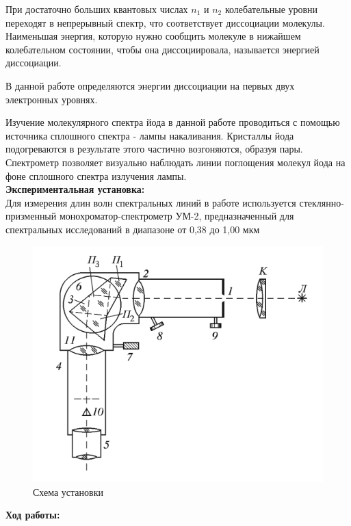 \documentclass[a4paper, 12pt]{article}%
\begin{document}
	При достаточно больших квантовых числах $n_1$ и $n_2$ колебательные уровни переходят в непрерывный спектр, что соответствует диссоциации молекулы. Наименьшая энергия, которую нужно сообщить молекуле в нижайшем колебательном состоянии, чтобы она диссоциировала, называется энергией диссоциации.
	
	В данной работе определяются энергии диссоциации на первых двух электронных уровнях.
	
	 Изучение молекулярного спектра йода в данной работе проводиться с помощью источника сплошного спектра - лампы накаливания. Кристаллы йода подогреваются в результате этого частично возгоняются, образуя пары. Спектрометр позволяет визуально наблюдать линии поглощения молекул йода на фоне сплошного спектра излучения лампы.\\
	
	\textbf{Экспериментальная установка: }\\
	
	Для измерения длин волн спектральных линий в работе используется стеклянно-призменный монохроматор-спектрометр УМ-2, предназначенный для спектральных исследований в диапазоне от 0,38 до 1,00 мкм
	
	\begin{figure}[H]
		\centering
		\includegraphics[width=0.6\linewidth]{ust}
		\caption{Схема установки}
	\end{figure}
	
	\newpage

	\textbf{Ход работы: }\\
	
\end{document}
